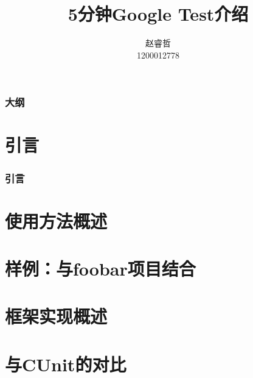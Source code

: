 \documentclass[xelatex]{beamer}
\begin{document}
\title{5分钟Google Test介绍}
\author{赵睿哲\\1200012778}
\frame{\titlepage}


\begin{frame}
	\frametitle{大纲}
	\tableofcontents
\end{frame}	

\section{引言}
\begin{frame}
	\frametitle{引言}
\end{frame}

\section{使用方法概述}

\section{样例：与foobar项目结合}

\section{框架实现概述}

\section{与CUnit的对比}
\end{document}
